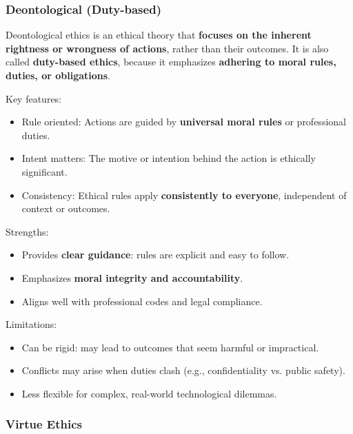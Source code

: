\subsubsection{Deontological (Duty-based)}

\indent 

Deontological ethics is an ethical theory that \textbf{focuses on the inherent rightness or wrongness of actions}, rather than their outcomes. It is also called \textbf{duty-based ethics}, because it emphasizes \textbf{adhering to moral rules, duties, or obligations}.

Key features:

\begin{itemize}
    \item Rule oriented: Actions are guided by \textbf{universal moral rules} or professional duties.
    \item Intent matters: The motive or intention behind the action is ethically significant.
    \item Consistency: Ethical rules apply \textbf{consistently to everyone}, independent of context or outcomes.
\end{itemize}

Strengths:

\begin{itemize}
    \item Provides \textbf{clear guidance}: rules are explicit and easy to follow.
    \item Emphasizes \textbf{moral integrity and accountability}.
    \item Aligns well with professional codes and legal compliance.
\end{itemize}

Limitations:

\begin{itemize}
    \item Can be rigid: may lead to outcomes that seem harmful or impractical.
    \item Conflicts may arise when duties clash (e.g., confidentiality vs. public safety).
    \item Less flexible for complex, real-world technological dilemmas.
\end{itemize}

\subsubsection{Virtue Ethics}

\indent 

